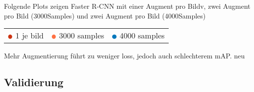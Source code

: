 Folgende Plots zeigen Faster R-CNN mit einer Augment pro 
Bildv, zwei Augment pro Bild (3000Samples) und 
zwei Augment pro Bild (4000Samples)
\\[1cm]
\begin{minipage}{0.5\textwidth}
  \centering
  \label{plot:map_diff_aug}
  \def\svgwidth{0.9\textwidth}
  
\end{minipage}
\begin{minipage}{0.5\textwidth}
  \centering
  \label{plot:loss_diff_aug}
  \def\svgwidth{0.9\textwidth}
  
\end{minipage}

\begin{table}[htb]
  \centering
  \begin{tabular}{m{}<{\centering}m{}<{\centering}m{}<{\centering}}
    $\color[HTML]{CC3311}\medbullet$  1 je bild & $\color[HTML]{FF7043}\medbullet$  3000 samples & $\color[HTML]{0077BB}\medbullet$  4000 samples
  \end{tabular}    
\end{table}

Mehr Augmentierung führt zu weniger loss, 
jedoch auch schlechterem mAP.
neu



\subsection{Validierung}


